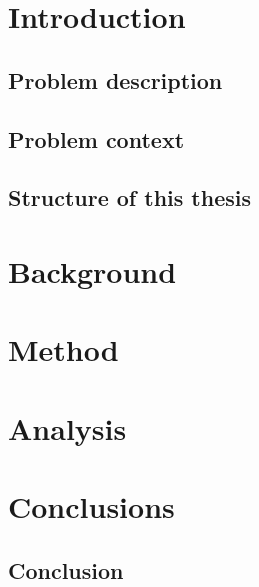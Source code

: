 \documentclass[12pt,a4paper,twoside,openright]{book}
\begin{document}
\mainmatter
\setcounter{secnumdepth}{5} 
\chapter{Introduction}
\label{chap:introduction}
\section{Problem description}
\label{sec:problem_description}


\section{Problem context}
\label{sec:problem_context}


\section{Structure of this thesis}
\label{sec:thesis_structure}


\chapter{Background}
\label{chap:background}


\chapter{Method}
\label{chap:method}


\chapter{Analysis}
\label{chap:analysis}


\chapter{Conclusions}
\label{chap:conclusion}

\section{Conclusion}
\label{sec:conclusion}

\end{document}
